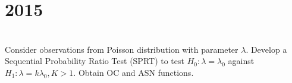 \section*{2015}
\vspace{-.5cm}
\hrulefill \smallskip\\
 Consider observations from Poisson distribution with parameter $\lambda$. Develop a Sequential Probability Ratio Test (SPRT) to test $H_0: \lambda = \lambda_0$ against $H_1: \lambda = k\lambda_0, K>1$. Obtain OC and ASN functions. 